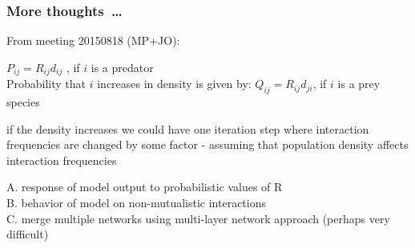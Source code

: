 \documentclass[12pt]{article}
\begin{document}
\subsubsection*{More thoughts~\ldots}

From meeting 20150818 (MP+JO):

$P_{ij} = R_{ij} d_{ij}$ , if $i$ is a predator\\

Probability that $i$ increases in density is given by:
$Q_{ij} = R_{ij} d_{ji}$, if $i$ is a prey species 

if the density increases we could have one iteration step where interaction frequencies are changed by some factor - assuming that population density affects interaction frequencies



A. response of model output to probabilistic values of R\\
B. behavior of model on non-mutualistic interactions\\
C. merge multiple networks using multi-layer network approach (perhaps very difficult)




\end{document}
